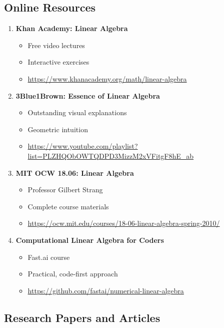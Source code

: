 \documentclass[12pt,a4paper]{article}
\theoremstyle{definition}
\begin{document}
\subsection{Online Resources}

\begin{enumerate}
    \item \textbf{Khan Academy: Linear Algebra}
    \begin{itemize}
        \item Free video lectures
        \item Interactive exercises
        \item \url{https://www.khanacademy.org/math/linear-algebra}
    \end{itemize}
    
    \item \textbf{3Blue1Brown: Essence of Linear Algebra}
    \begin{itemize}
        \item Outstanding visual explanations
        \item Geometric intuition
        \item \url{https://www.youtube.com/playlist?list=PLZHQObOWTQDPD3MizzM2xVFitgF8hE_ab}
    \end{itemize}
    
    \item \textbf{MIT OCW 18.06: Linear Algebra}
    \begin{itemize}
        \item Professor Gilbert Strang
        \item Complete course materials
        \item \url{https://ocw.mit.edu/courses/18-06-linear-algebra-spring-2010/}
    \end{itemize}
    
    \item \textbf{Computational Linear Algebra for Coders}
    \begin{itemize}
        \item Fast.ai course
        \item Practical, code-first approach
        \item \url{https://github.com/fastai/numerical-linear-algebra}
    \end{itemize}
\end{enumerate}

\subsection{Research Papers and Articles}
\end{document}
